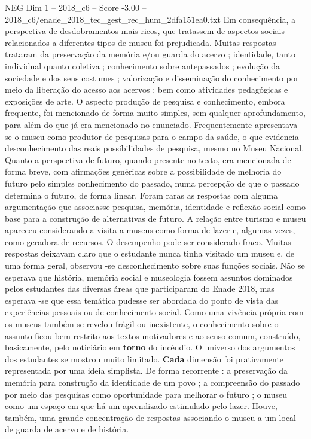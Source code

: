 \begin{textsample}{NEG Dim 1 – 2018\_c6 – Score -3.00 – 2018\_c6/enade\_2018\_tec\_gest\_rec\_hum\_2dfa151ea0.txt}
Em consequência, a perspectiva de desdobramentos mais ricos, que tratassem de aspectos sociais relacionados a diferentes tipos de museu foi prejudicada.
Muitas respostas trataram da preservação da memória e/ou guarda do acervo ; identidade, tanto individual quanto coletiva ; conhecimento sobre antepassados ; evolução da sociedade e dos seus costumes ; valorização e disseminação do conhecimento por meio da liberação do acesso aos acervos ; bem como atividades pedagógicas e exposições de arte.
O aspecto produção de pesquisa e conhecimento, embora frequente, foi mencionado de forma muito simples, sem qualquer aprofundamento, para além do que já era mencionado no enunciado.
Frequentemente apresentava -se o museu como produtor de pesquisas para o campo da saúde, o que evidencia desconhecimento das reais possibilidades de pesquisa, mesmo no Museu Nacional.
Quanto a perspectiva de futuro, quando presente no texto, era mencionada de forma breve, com afirmações genéricas sobre a possibilidade de melhoria do futuro pelo simples conhecimento do passado, numa percepção de que o passado determina o futuro, de forma linear.
Foram raras as respostas com alguma argumentação que associasse pesquisa, memória, identidade e reflexão social como base para a construção de alternativas de futuro.
A relação entre turismo e museu apareceu considerando a visita a museus como forma de lazer e, algumas vezes, como geradora de recursos.
O desempenho pode ser considerado fraco.
Muitas respostas deixavam claro que o estudante nunca tinha visitado um museu e, de uma forma geral, observou -se desconhecimento sobre suas funções sociais.
Não se esperava que história, memória social e museologia fossem assuntos dominados pelos estudantes das diversas áreas que participaram do Enade 2018, mas esperava -se que essa temática pudesse ser abordada do ponto de vista das experiências pessoais ou de conhecimento social.
Como uma vivência própria com os museus também se revelou frágil ou inexistente, o conhecimento sobre o assunto ficou bem restrito aos textos motivadores e ao senso comum, construído, basicamente, pelo noticiário em \textbf{torno} do incêndio.
O universo dos argumentos dos estudantes se mostrou muito limitado. \textbf{Cada} dimensão foi praticamente representada por uma ideia simplista.
De forma recorrente : a preservação da memória para construção da identidade de um povo ; a compreensão do passado por meio das pesquisas como oportunidade para melhorar o futuro ; o museu como um espaço em que há um aprendizado estimulado pelo lazer.
Houve, também, uma grande concentração de respostas associando o museu a um local de guarda de acervo e de história.

\end{textsample}
